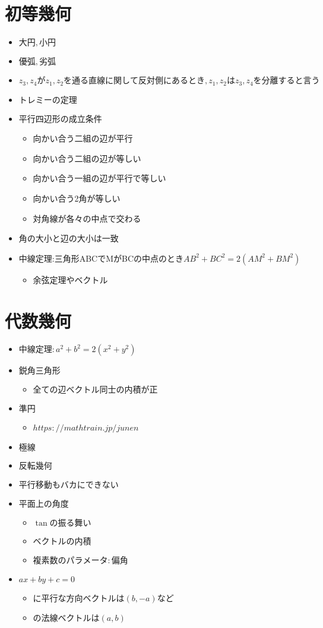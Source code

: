 \documentclass[dvipdfmx,uplatex]{jsarticle}
\begin{document}
\section{初等幾何}
\begin{itemize}
	\item $ 大円,小円$
	\item $ 優弧,劣弧$
	\item $ z_3,z_4がz_1,z_2を通る直線に関して反対側にあるとき,z_1,z_2はz_3,z_4を分離すると言う$
	\item $ トレミーの定理$
	\item 平行四辺形の成立条件
	\begin{itemize}
		\item 向かい合う二組の辺が平行
		\item 向かい合う二組の辺が等しい
		\item 向かい合う一組の辺が平行で等しい
		\item 向かい合う2角が等しい
		\item 対角線が各々の中点で交わる
	\end{itemize}
	\item 角の大小と辺の大小は一致
	\item 中線定理:三角形ABCでMがBCの中点のとき$AB^2+BC^2=2(AM^2+BM^2)$
	\begin{itemize}
		\item 余弦定理やベクトル
	\end{itemize}
\end{itemize}

\section{代数幾何}
\begin{itemize}
	\item $ 中線定理: a^2+b^2 = 2(x^2+y^2)$
	\item $ 鋭角三角形$
	\begin{itemize}
		\item $ 全ての辺ベクトル同士の内積が正$
	\end{itemize}
	\item $ 準円$
	\begin{itemize}
		\item $ https://mathtrain.jp/junen$
	\end{itemize}
	\item $ 極線$
	\item $ 反転幾何$
	\item $ 平行移動もバカにできない$
	\item $ 平面上の角度$
	\begin{itemize}
		\item $ \tan の振る舞い$
		\item $ ベクトルの内積$
		\item $ 複素数のパラメータ:偏角$
	\end{itemize}
	\item $ ax+by+c=0$
	\begin{itemize}
		\item $ に平行な方向ベクトルは(b,-a)など$
		\item $ の法線ベクトルは(a,b)$
	\end{itemize}
\end{itemize}
\end{document}

